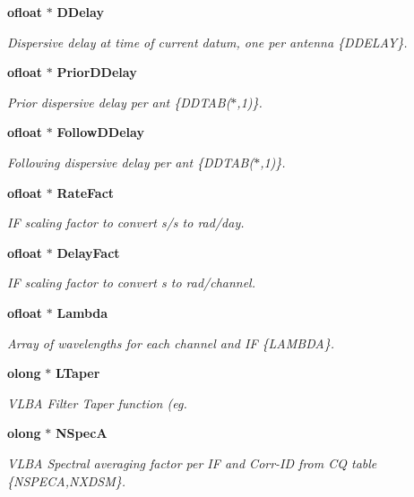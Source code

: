\begin{CompactItemize}
{\bf ofloat} $\ast$ {\bf DDelay}
\begin{CompactList}\small\item\em Dispersive delay at time of current datum, one per antenna \{DDELAY\}. \item\end{CompactList}\item 
{\bf ofloat} $\ast$ {\bf Prior\-DDelay}
\begin{CompactList}\small\item\em Prior dispersive delay per ant \{DDTAB($\ast$,1)\}. \item\end{CompactList}\item 
{\bf ofloat} $\ast$ {\bf Follow\-DDelay}
\begin{CompactList}\small\item\em Following dispersive delay per ant \{DDTAB($\ast$,1)\}. \item\end{CompactList}\item 
{\bf ofloat} $\ast$ {\bf Rate\-Fact}
\begin{CompactList}\small\item\em IF scaling factor to convert s/s to rad/day. \item\end{CompactList}\item 
{\bf ofloat} $\ast$ {\bf Delay\-Fact}
\begin{CompactList}\small\item\em IF scaling factor to convert s to rad/channel. \item\end{CompactList}\item 
{\bf ofloat} $\ast$ {\bf Lambda}
\begin{CompactList}\small\item\em Array of wavelengths for each channel and IF \{LAMBDA\}. \item\end{CompactList}\item 
{\bf olong} $\ast$ {\bf LTaper}
\begin{CompactList}\small\item\em VLBA Filter Taper function (eg. \item\end{CompactList}\item 
{\bf olong} $\ast$ {\bf NSpec\-A}
\begin{CompactList}\small\item\em VLBA Spectral averaging factor per IF and Corr-ID from CQ table \{NSPECA,NXDSM\}. \item\end{CompactList}\item 

\end{CompactItemize}
